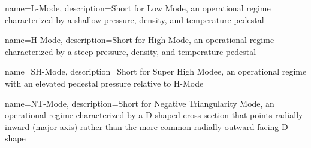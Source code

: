 { 	name=L-Mode, 
	description={Short for Low Mode, an operational regime characterized by a shallow pressure, density, and temperature pedestal}
}

{	name=H-Mode,
	description={Short for High Mode, an operational regime characterized by a steep pressure, density, and temperature pedestal}
}

{	name=SH-Mode,
	description={Short for Super High Modee, an operational regime with an elevated pedestal pressure relative to H-Mode}
}

{	name=NT-Mode,
	description={Short for Negative Triangularity Mode, an operational regime characterized by a D-shaped cross-section that points radially inward (major axis) rather than the more common radially outward facing D-shape}
}

